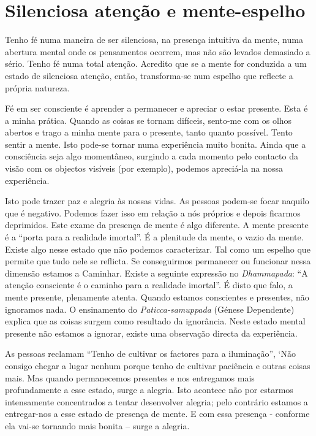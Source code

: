 \chapter{Silenciosa atenção e mente-espelho}

Tenho fé numa maneira de ser silenciosa, na presença intuitiva da mente, numa
abertura mental onde os pensamentos ocorrem, mas não são levados demasiado a
sério. Tenho fé numa total atenção. Acredito que se a mente for conduzida a um
estado de silenciosa atenção, então, transforma-se num espelho que reflecte a
própria natureza.

Fé em ser consciente é aprender a permanecer e apreciar o estar
presente. Esta é a minha prática. Quando as coisas se tornam difíceis,
sento-me com os olhos abertos e trago a minha mente para o presente,
tanto quanto possível. Tento sentir a mente. Isto pode-se tornar numa
experiência muito bonita. Ainda que a consciência seja algo momentâneo,
surgindo a cada momento pelo contacto da visão com os objectos visíveis
(por exemplo), podemos apreciá-la na nossa experiência.

Isto pode trazer paz e alegria às nossas vidas. As pessoas podem-se
focar naquilo que é negativo. Podemos fazer isso em relação a nós
próprios e depois ficarmos deprimidos. Este exame da presença de mente é
algo diferente. A mente presente é a ``porta para a realidade imortal''.
É a plenitude da mente, o vazio da mente. Existe algo nesse estado que
não podemos caracterizar. Tal como um espelho que permite que tudo nele
se reflicta. Se conseguirmos permanecer ou funcionar nessa dimensão
estamos a Caminhar. Existe a seguinte expressão no \emph{Dhammapada}:
``A atenção consciente é o caminho para a realidade imortal''. É disto
que falo, a mente presente, plenamente atenta. Quando estamos
conscientes e presentes, não ignoramos nada. O ensinamento do
\emph{Paticca-samuppada} (Génese Dependente) explica que as coisas
surgem como resultado da ignorância. Neste estado mental presente não
estamos a ignorar, existe uma observação directa da experiência.

As pessoas reclamam ``Tenho de cultivar os factores para a iluminação'',
`Não consigo chegar a lugar nenhum porque tenho de cultivar paciência e
outras coisas mais. Mas quando permanecemos presentes e nos entregamos
mais profundamente a esse estado, surge a alegria. Isto acontece não por
estarmos intensamente concentrados a tentar desenvolver alegria; pelo
contrário estamos a entregar-nos a esse estado de presença de mente. E
com essa presença - conforme ela vai-se tornando mais bonita -- surge a
alegria.

